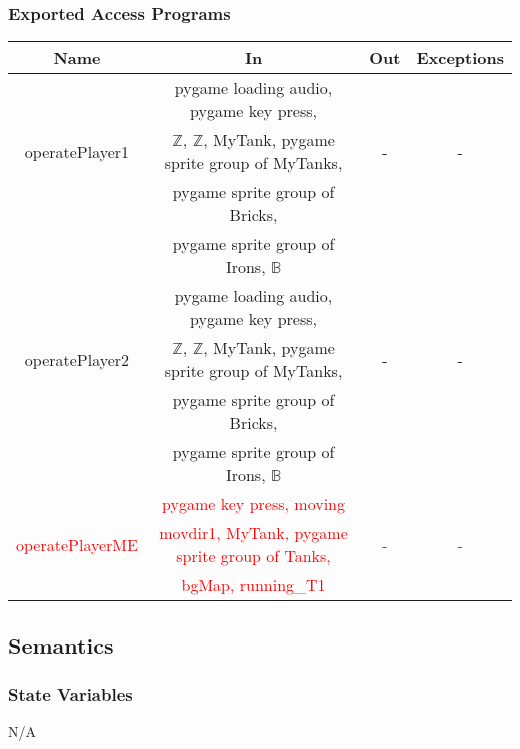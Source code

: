 \documentclass[12pt, titlepage]{article}
\begin{document}
		\subsubsection{Exported Access Programs}
				\begin{tabular}[pos]{|c|c|c|c|}
					
					\hline
					\textbf{Name} & \textbf{In} & \textbf{Out} & \textbf{Exceptions} \\ \hline
					& pygame loading audio, pygame key press,  &  &  \\ 
                    operatePlayer1 & $\mathbb{Z}$, $\mathbb{Z}$, MyTank, pygame sprite group of MyTanks,  & - & - \\ 
                    & pygame sprite group of Bricks,  &  &  \\ 
                    & pygame sprite group of Irons, $\mathbb{B}$ &  &  \\ \hline
                    
					& pygame loading audio, pygame key press,  &  &  \\ 
                    operatePlayer2 & $\mathbb{Z}$, $\mathbb{Z}$, MyTank, pygame sprite group of MyTanks,  & - & - \\ 
                    & pygame sprite group of Bricks,  &  &  \\ 
                    & pygame sprite group of Irons, $\mathbb{B}$ &  &  \\ \hline
                    
                    
                    & \textcolor{red}{pygame key press, moving} &  &  \\ 
                    \textcolor{red}{operatePlayerME} & \textcolor{red}{movdir1, MyTank, pygame sprite group of Tanks,}  & \textcolor{red}{-} & \textcolor{red}{- }\\ 
                    & \textcolor{red}{bgMap, running\_T1} &  & \\ 
                    
                    \hline
				\end{tabular}
				
		\subsection{Semantics}
		\subsubsection{State Variables}
		N/A
		
\end{document}
